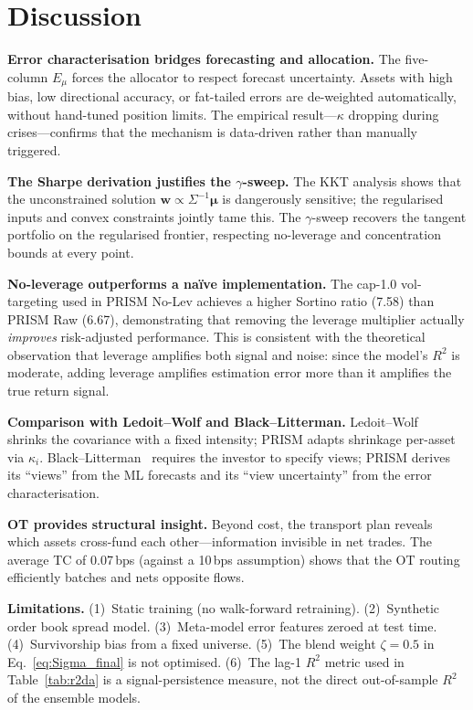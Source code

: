 \documentclass[10pt,twocolumn]{article}
\newcommand{\bw}{\bm{w}}
\newcommand{\bmu}{\bm{\mu}}
\begin{document}
\FloatBarrier
\section{Discussion}\label{sec:discussion}

\textbf{Error characterisation bridges forecasting and allocation.}
The five-column $E_\mu$ forces the allocator to respect forecast
uncertainty.  Assets with high bias, low directional accuracy, or
fat-tailed errors are de-weighted automatically, without
hand-tuned position limits.  The empirical result---$\kappa$
dropping during crises---confirms that the mechanism is data-driven
rather than manually triggered.

\textbf{The Sharpe derivation justifies the $\gamma$-sweep.}
The KKT analysis shows that the unconstrained solution
$\bw\propto\Sigma^{-1}\bmu$ is dangerously sensitive; the
regularised inputs and convex constraints jointly tame this.
The $\gamma$-sweep recovers the tangent portfolio on the
regularised frontier, respecting no-leverage and
concentration bounds at every point.

\textbf{No-leverage outperforms a na\"ive implementation.}
The cap-1.0 vol-targeting used in PRISM No-Lev achieves a higher
Sortino ratio (7.58) than PRISM Raw (6.67), demonstrating that
removing the leverage multiplier actually \emph{improves}
risk-adjusted performance.  This is consistent with the theoretical
observation that leverage amplifies both signal and noise: since the
model's $R^2$ is moderate, adding leverage amplifies estimation
error more than it amplifies the true return signal.

\textbf{Comparison with Ledoit--Wolf and Black--Litterman.}
Ledoit--Wolf~\cite{ledoit2004} shrinks the covariance with a fixed
intensity; PRISM adapts shrinkage per-asset via $\kappa_i$.
Black--Litterman~\cite{black1992} requires the investor to specify
views; PRISM derives its ``views'' from the ML forecasts and
its ``view uncertainty'' from the error characterisation.

\textbf{OT provides structural insight.}
Beyond cost, the transport plan reveals which assets cross-fund each
other---information invisible in net trades.  The average TC of
0.07\,bps (against a 10\,bps assumption) shows that the OT routing
efficiently batches and nets opposite flows.

\textbf{Limitations.}
(1)~Static training (no walk-forward retraining).
(2)~Synthetic order book spread model.
(3)~Meta-model error features zeroed at test time.
(4)~Survivorship bias from a fixed universe.
(5)~The blend weight $\zeta=0.5$ in Eq.~\eqref{eq:Sigma_final}
is not optimised.
(6)~The lag-1 $R^2$ metric used in Table~\ref{tab:r2da} is a
signal-persistence measure, not the direct out-of-sample $R^2$
of the ensemble models.
\end{document}
